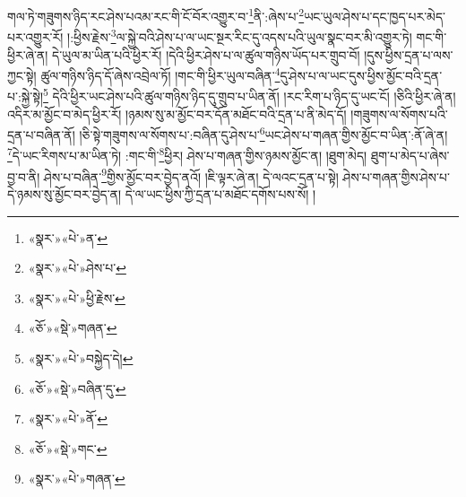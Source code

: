 གལ་ཏེ་གཟུགས་ཉིད་རང་ཤེས་པའམ་རང་གི་ངོ་བོར་འགྱུར་བ་\footnote{«སྣར་»«པེ་»ན་}ནི་:ཞེས་པ་\footnote{«སྣར་»«པེ་»ཤེས་པ་}ཡང་ཡུལ་ཤེས་པ་དང་ཁྱད་པར་མེད་པར་འགྱུར་རོ། །:ཕྱིས་རྗེས་\footnote{«སྣར་»«པེ་»ཕྱི་རྗེས་}ལ་སྐྱེ་བའི་ཤེས་པ་ལ་ཡང་སྔར་རིང་དུ་འདས་པའི་ཡུལ་སྣང་བར་མི་འགྱུར་ཏེ། གང་གི་ཕྱིར་ཞེ་ན། དེ་ཡུལ་མ་ཡིན་པའི་ཕྱིར་རོ། །དེའི་ཕྱིར་ཤེས་པ་ལ་ཚུལ་གཉིས་ཡོད་པར་གྲུབ་བོ། །དུས་ཕྱིས་དྲན་པ་ལས་ཀྱང་སྟེ། ཚུལ་གཉིས་ཉིད་དོ་ཞེས་འབྲེལ་ཏོ། །གང་གི་ཕྱིར་ཡུལ་བཞིན་\footnote{«ཅོ་»«སྡེ་»གཞན་}དུ་ཤེས་པ་ལ་ཡང་དུས་ཕྱིས་མྱོང་བའི་དྲན་པ་:སྐྱེ་སྟེ།\footnote{«སྣར་»«པེ་»བསྐྱེད་དེ།} དེའི་ཕྱིར་ཡང་ཤེས་པའི་ཚུལ་གཉིས་ཉིད་དུ་གྲུབ་པ་ཡིན་ནོ། །རང་རིག་པ་ཉིད་དུ་ཡང་ངོ། །ཅིའི་ཕྱིར་ཞེ་ན། འདིར་མ་མྱོང་བ་མེད་ཕྱིར་རོ། །ཉམས་སུ་མ་མྱོང་བར་དོན་མཐོང་བའི་དྲན་པ་ནི་མེད་དོ། །གཟུགས་ལ་སོགས་པའི་དྲན་པ་བཞིན་ནོ། །ཅི་སྟེ་གཟུགས་ལ་སོགས་པ་:བཞིན་དུ་ཤེས་པ་\footnote{«ཅོ་»«སྡེ་»བཞིན་དུ་}ཡང་ཤེས་པ་གཞན་གྱིས་མྱོང་བ་ཡིན་:ནོ་ཞེ་ན། \footnote{«སྣར་»«པེ་»ནོ་}དེ་ཡང་རིགས་པ་མ་ཡིན་ཏེ། :གང་གི་\footnote{«ཅོ་»«སྡེ་»གང་}ཕྱིར། ཤེས་པ་གཞན་གྱིས་ཉམས་མྱོང་ན། །ཐུག་མེད། ཐུག་པ་མེད་པ་ཞེས་བྱ་བ་ནི། ཤེས་པ་བཞིན་\footnote{«སྣར་»«པེ་»གཞན་}གྱིས་མྱོང་བར་བྱེད་ནའོ། །ཇི་ལྟར་ཞེ་ན། དེ་ལའང་དྲན་པ་སྟེ། ཤེས་པ་གཞན་གྱིས་ཤེས་པ་དེ་ཉམས་སུ་མྱོང་བར་བྱེད་ན། དེ་ལ་ཡང་ཕྱིས་ཀྱི་དྲན་པ་མཐོང་དགོས་པས་སོ། །
